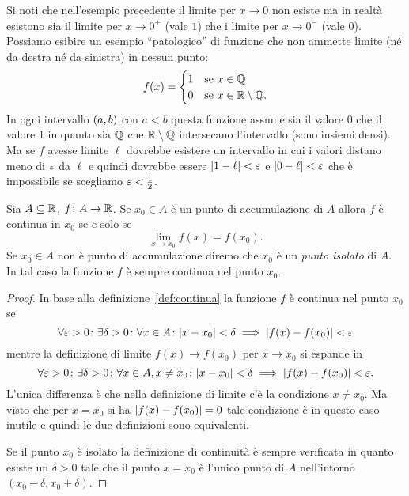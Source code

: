 Si noti che nell'esempio precedente il limite per $x\to 0$ 
non esiste ma in realtà esistono sia il limite per $x\to 0^+$ 
(vale $1$) che i limite per $x\to 0^-$ (vale $0$).
Possiamo esibire un esempio ``patologico'' di funzione 
che non ammette limite (né da destra né da sinistra)
in nessun punto:
\[
  f(x) = 
  \begin{cases}
     1 & \text{se $x\in {\mathbb Q}$}\\ 
     0 & \text{se $x\in {\mathbb R}\setminus {\mathbb Q}$}.
  \end{cases}
\]
In ogni intervallo $\left(a,b\right)$ con $a<b$ questa funzione 
assume sia il valore $0$ che il valore $1$ 
in quanto sia ${\mathbb Q}$ che ${\mathbb R}\setminus {\mathbb Q}$ intersecano 
l'intervallo (sono insiemi densi).
Ma se $f$ avesse limite $\ell$ dovrebbe esistere un intervallo 
in cui i valori distano meno di $\varepsilon$ da $\ell$ e quindi 
dovrebbe essere ${\left|1-\ell\right|}<\varepsilon$ e ${\left|0-\ell\right|}<\varepsilon$
che è impossibile se scegliamo $\varepsilon < \frac 1 2$.

\begin{theorem}%
\mymark{***}%
  Sia $A\subseteq {\mathbb R}$, $f\colon A \to {\mathbb R}$. 
  Se $x_0\in A$ è un punto di accumulazione di $A$
  allora $f$ è continua in $x_0$ se e solo se
  \[
    \lim_{x\to x_0}f(x) = f(x_0).
  \]
  Se $x_0\in A$ non è punto di accumulazione diremo 
  che $x_0$ è un \emph{punto isolato}%
%
 di $A$.
  In tal caso la funzione $f$ è sempre continua nel punto $x_0$.
\end{theorem}
  
  \begin{proof}
  In base alla definizione~\ref{def:continua} la funzione $f$ è continua nel
  punto $x_0$ se
  \[
   \forall \varepsilon>0 \colon \exists \delta >0 \colon
   \forall x \in A\colon
   {\left|x-x_0\right|}<\delta \implies {\left|f(x)-f(x_0)\right|} < \varepsilon
  \]
  mentre la definizione di limite $f(x)\to f(x_0)$ per $x\to x_0$
  si espande in
  \[
  \forall \varepsilon>0 \colon \exists \delta>0\colon
  \forall x \in A, x\neq x_0\colon
  {\left|x-x_0\right|}<\delta \implies {\left|f(x)-f(x_0)\right|} < \varepsilon.
  \]
  L'unica differenza è che nella definizione di limite
  c'è la condizione $x\neq x_0$. Ma visto che per $x=x_0$
  si ha ${\left|f(x)-f(x_0)\right|}=0$ tale condizione è in questo caso 
  inutile e quindi le due definizioni sono equivalenti.

  Se il punto $x_0$ è isolato la definizione di continuità
  è sempre verificata in quanto esiste un $\delta>0$ 
  tale che il punto $x=x_0$ è l'unico punto di $A$ 
  nell'intorno $(x_0-\delta,x_0+\delta)$.
  \end{proof}

